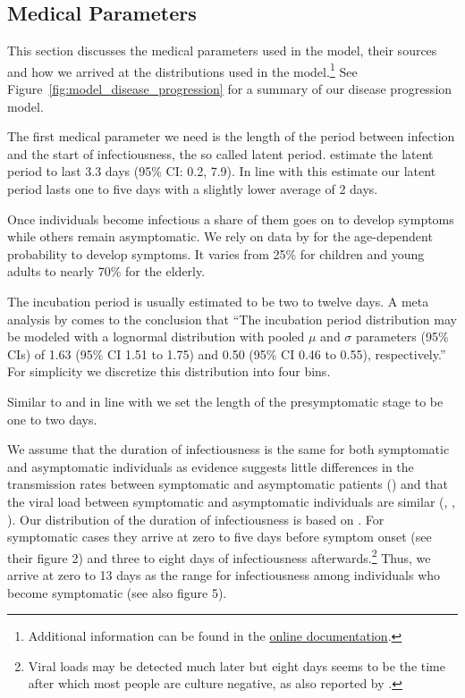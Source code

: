 \subsection{Medical Parameters}
\label{sec:medical_params}

This section discusses the medical parameters used in the model, their sources and how
we arrived at the distributions used in the model.\footnote{Additional information can
be found in the
\href{https://sid-dev.readthedocs.io/en/latest/reference_guides/epi_params.html}{online
documentation}.} See Figure~\ref{fig:model_disease_progression} for a summary of our
disease progression model.



The first medical parameter we need is the length of the period between infection and
the start of infectiousness, the so called latent period. \cite{Zhao2021} estimate the
latent period to last 3.3 days (95\% CI: 0.2, 7.9). In line with this estimate our
latent period lasts one to five days with a slightly lower average of 2 days.

Once individuals become infectious a share of them goes on to develop symptoms while
others remain asymptomatic. We rely on data by \cite{Davies2020} for the age-dependent
probability to develop symptoms. It varies from 25\% for children and young adults to
nearly 70\% for the elderly.

The incubation period is usually estimated to be two to twelve days. A meta analysis by
\citet{McAloon2020} comes to the conclusion that ``The incubation period distribution
may be modeled with a lognormal distribution with pooled $\mu$ and $\sigma$ parameters
(95\% CIs) of 1.63 (95\% CI 1.51 to 1.75) and 0.50 (95\% CI 0.46 to 0.55),
respectively.'' For simplicity we discretize this distribution into four bins.

Similar to \citet{Peak2020} and in line with \citet{He2020} we set the length of the
presymptomatic stage to be one to two days.


We assume that the duration of infectiousness is the same for both symptomatic and
asymptomatic individuals as evidence suggests little differences in the transmission
rates between symptomatic and asymptomatic patients (\citet{Yin2020}) and that the viral
load between symptomatic and asymptomatic individuals are similar (\citet{Zou2020},
\citet{Byrne2020}, \citet{Singanayagam2020}). Our distribution of the duration of
infectiousness is based on \citet{Byrne2020}. For symptomatic cases they arrive at zero
to five days before symptom onset (see their figure 2) and three to eight days of
infectiousness afterwards.\footnote{Viral loads may be detected much later but eight
days seems to be the time after which most people are culture negative, as also reported
by \citet{Singanayagam2020}.} Thus, we arrive at zero to 13 days as the range for
infectiousness among individuals who become symptomatic (see also figure 5).


